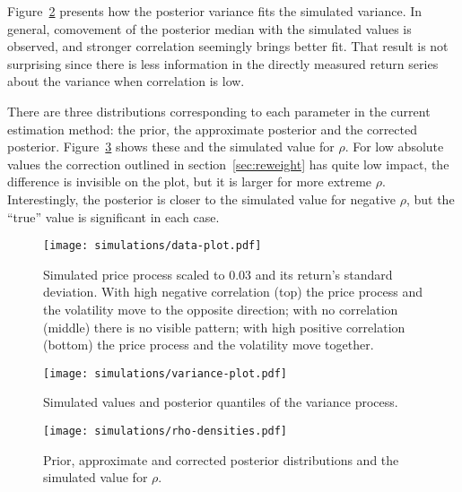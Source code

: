 Figure~\ref{fig:volatility} presents how the posterior variance fits the simulated variance.
In general, comovement of the posterior median with the simulated values is observed, and stronger correlation seemingly brings better fit.
That result is not surprising since there is less information in the directly measured return series about the variance when correlation is low.

There are three distributions corresponding to each parameter in the current estimation method: the prior, the approximate posterior and the corrected posterior.
Figure~\ref{fig:rhodensities} shows these and the simulated value for $\rho$.
For low absolute values the correction outlined in section~\ref{sec:reweight} has quite low impact, the difference is invisible on the plot, but it is larger for more extreme $\rho$.
Interestingly, the posterior is closer to the simulated value for negative $\rho$, but the ``true'' value is significant in each case.

\begin{figure}
	\centering
	\texttt{[image: simulations/data-plot.pdf]}
	\caption[Simulated price process and standard deviation]{Simulated price process scaled to 0.03 and its return's standard deviation. With high negative correlation (top) the price process and the volatility move to the opposite direction; with no correlation (middle) there is no visible pattern; with high positive correlation (bottom) the price process and the volatility move together.}
	\label{fig:simdata}
\end{figure}

\begin{figure}
	\centering
	\texttt{[image: simulations/variance-plot.pdf]}
	\caption{Simulated values and posterior quantiles of the variance process.}
	\label{fig:volatility}
\end{figure}

\begin{figure}
	\centering
	\texttt{[image: simulations/rho-densities.pdf]}
	\caption[Prior, approximate and corrected posterior and simulated $\rho$]{Prior, approximate and corrected posterior distributions and the simulated value for $\rho$.}
	\label{fig:rhodensities}
\end{figure}
